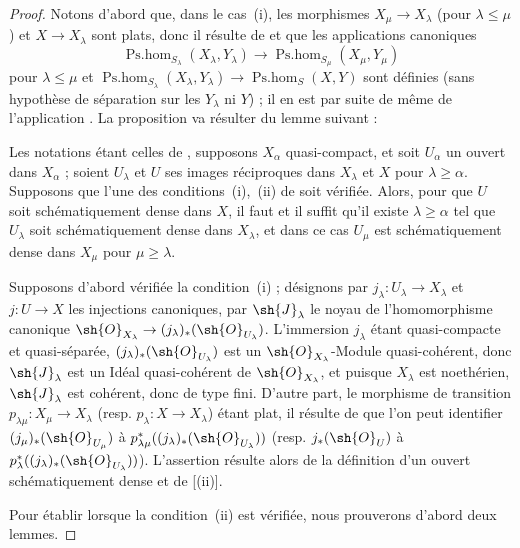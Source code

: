 \begin{proof}
Notons d'abord que, dans le cas~(i), les morphismes $X_\mu\to X_\lambda$ (pour $\lambda\leq\mu$) et $X\to X_\lambda$ sont plats, donc il résulte de  et  que les applications canoniques
\[
  \operatorname{Ps.hom}_{S_\lambda}(X_\lambda,Y_\lambda)\to\operatorname{Ps.hom}_{S_\mu}(X_\mu,Y_\mu)
\]
pour $\lambda\leq\mu$ et $\operatorname{Ps.hom}_{S_\lambda}(X_\lambda,Y_\lambda)\to\operatorname{Ps.hom}_S(X,Y)$ sont définies (sans hypothèse de séparation sur les $Y_\lambda$ ni $Y$) ; il en est par suite de même de l'application .
La proposition va résulter du lemme suivant :

\begin{lemma}[20.3.8.2]
\label{IV.20.3.8.2}
Les notations étant celles de , supposons $X_\alpha$ quasi-compact, et soit $U_\alpha$ un ouvert dans $X_\alpha$ ; soient $U_\lambda$ et $U$ ses images réciproques dans $X_\lambda$ et $X$ pour $\lambda\geq\alpha$.
Supposons que l'une des conditions~\textup{(i)},~\textup{(ii)} de  soit vérifiée.
Alors, pour que $U$ soit schématiquement dense dans $X$, il faut et il suffit qu'il existe $\lambda\geq\alpha$ tel que $U_\lambda$ soit schématiquement dense dans $X_\lambda$, et dans ce cas $U_\mu$ est schématiquement dense dans $X_\mu$ pour $\mu\geq\lambda$.
\end{lemma}

Supposons d'abord vérifiée la condition~(i) ; désignons par $j_\lambda:U_\lambda\to X_\lambda$ et $j:U\to X$ les injections canoniques, par $\sh{J}_\lambda$ le noyau de l'homomorphisme canonique $\sh{O}_{X_\lambda}\to(j_\lambda)_*(\sh{O}_{U_\lambda})$.
L'immersion $j_\lambda$ étant quasi-compacte et quasi-séparée, $(j_\lambda)_*(\sh{O}_{U_\lambda})$ est un $\sh{O}_{X_\lambda}$-Module quasi-cohérent, donc $\sh{J}_\lambda$ est un Idéal quasi-cohérent de $\sh{O}_{X_\lambda}$, et puisque $X_\lambda$ est noethérien, $\sh{J}_\lambda$ est cohérent, donc de type fini.
D'autre part, le morphisme de transition $p_{\lambda\mu}:X_\mu\to X_\lambda$ (resp. $p_\lambda:X\to X_\lambda$) étant plat, il résulte de  que l'on peut identifier $(j_\mu)_*(\sh{O}_{U_\mu})$ à $p_{\lambda\mu}^*((j_\lambda)_*(\sh{O}_{U_\lambda}))$ (resp. $j_*(\sh{O}_U)$ à $p_\lambda^*((j_\lambda)_*(\sh{O}_{U_\lambda}))$).
L'assertion résulte alors de la définition d'un ouvert schématiquement dense et de [(ii)].

Pour établir  lorsque la condition~(ii) est vérifiée, nous prouverons d'abord deux lemmes.


\end{proof}
